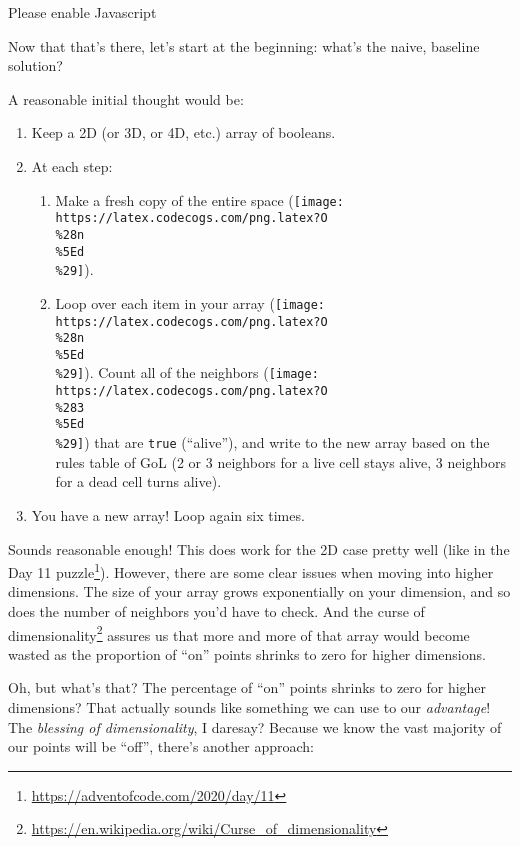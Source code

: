\documentclass[]{article}
\renewcommand{\href}[2]{#2\footnote{\url{#1}}}
\begin{document}
\leavevmode\hypertarget{gol2DCont}{}%
Please enable Javascript

Now that that's there, let's start at the beginning: what's the naive, baseline
solution?

A reasonable initial thought would be:

\begin{enumerate}
\def\labelenumi{\arabic{enumi}.}
\tightlist
\item
  Keep a 2D (or 3D, or 4D, etc.) array of booleans.
\item
  At each step:

  \begin{enumerate}
  \def\labelenumii{\alph{enumii}.}
  \tightlist
  \item
    Make a fresh copy of the entire space
    (\texttt{[image: https://latex.codecogs.com/png.latex?O\\\%28n\\\%5Ed\\\%29]}).
  \item
    Loop over each item in your array
    (\texttt{[image: https://latex.codecogs.com/png.latex?O\\\%28n\\\%5Ed\\\%29]}).
    Count all of the neighbors
    (\texttt{[image: https://latex.codecogs.com/png.latex?O\\\%283\\\%5Ed\\\%29]})
    that are \texttt{true} (``alive''), and write to the new array based on the
    rules table of GoL (2 or 3 neighbors for a live cell stays alive, 3
    neighbors for a dead cell turns alive).
  \end{enumerate}
\item
  You have a new array! Loop again six times.
\end{enumerate}

Sounds reasonable enough! This does work for the 2D case pretty well (like in
the \href{https://adventofcode.com/2020/day/11}{Day 11 puzzle}). However, there
are some clear issues when moving into higher dimensions. The size of your array
grows exponentially on your dimension, and so does the number of neighbors you'd
have to check. And the
\href{https://en.wikipedia.org/wiki/Curse_of_dimensionality}{curse of
dimensionality} assures us that more and more of that array would become wasted
as the proportion of ``on'' points shrinks to zero for higher dimensions.

Oh, but what's that? The percentage of ``on'' points shrinks to zero for higher
dimensions? That actually sounds like something we can use to our
\emph{advantage}! The \emph{blessing of dimensionality}, I daresay? Because we
know the vast majority of our points will be ``off'', there's another approach:
\end{document}
